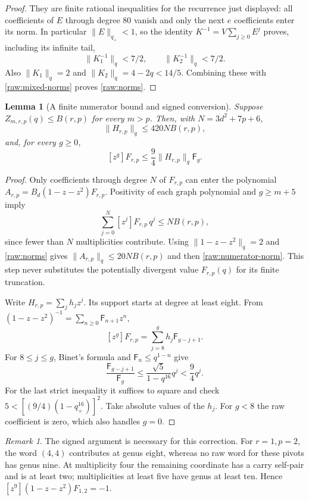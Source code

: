 \documentclass[11pt]{amsart}
\newtheorem{lemma}[theorem]{Lemma}
\theoremstyle{definition}
\theoremstyle{remark}
\newtheorem{remark}[theorem]{Remark}
\newcommand{\Fib}{\mathsf F}
\numberwithin{equation}{section}
\begin{document}
\begin{proof}
They are finite rational inequalities for the recurrence just displayed:
all coefficients of $E$ through degree $80$ vanish and only the next
$e$ coefficients enter its norm.  In particular $\|E\|_{q_+}<1$,
so the identity $K^{-1}=V\sum_{j\ge0}E^j$ proves, including its
infinite tail,
\[
 \|K_1^{-1}\|_q<7/2,\qquad \|K_2^{-1}\|_q<7/2.
\]
Also $\|K_1\|_q=2$ and $\|K_2\|_q=4-2q<14/5$.
Combining these with \eqref{raw:mixed-norms} proves \eqref{raw:norms}.
\end{proof}

\begin{lemma}[A finite numerator bound and signed conversion]\label{raw:signed}
Suppose $Z_{m,r,p}(q)\le B(r,p)$ for every $m>p$.  Then, with
$N=3d^2+7p+6$,
\begin{equation}\label{raw:numerator-norm}
 \|H_{r,p}\|_q\le420N B(r,p),
\end{equation}
and, for every $g\ge0$,
\begin{equation}\label{raw:fib-conversion}
 [z^g]F_{r,p}\le\frac94\|H_{r,p}\|_q\Fib_g.
\end{equation}
\end{lemma}
\begin{proof}
Only coefficients through degree $N$ of $F_{r,p}$ can enter the polynomial
$A_{r,p}=B_d(1-z-z^2)F_{r,p}$.  Positivity of each graph polynomial
and $g\ge m+5$ imply
\[
 \sum_{j=0}^N[z^j]F_{r,p}\,q^j\le N B(r,p),
\]
since fewer than $N$ multiplicities contribute.  Using
$\|1-z-z^2\|_q=2$ and \eqref{raw:norms} gives
$\|A_{r,p}\|_q\le20NB(r,p)$ and then
\eqref{raw:numerator-norm}.  This step never substitutes the potentially
divergent value $F_{r,p}(q)$ for its finite truncation.

Write $H_{r,p}=\sum_jh_jz^j$.  Its support starts at degree at least
eight.  From $(1-z-z^2)^{-1}=\sum_{n\ge0}\Fib_{n+1}z^n$,
\[
 [z^g]F_{r,p}=\sum_{j=8}^g h_j\Fib_{g-j+1}.
\]
For $8\le j\le g$, Binet's formula and
$\Fib_n\le q^{1-n}$ give
\[
 \frac{\Fib_{g-j+1}}{\Fib_g}
 \le \frac{\sqrt5}{1-q^{16}}q^j<\frac94q^j.
\]
For the last strict inequality it suffices to square and check
$5<[(9/4)(1-q_+^{16})]^2$.  Take absolute values of the $h_j$.
For $g<8$ the raw coefficient is zero, which also handles $g=0$.
\end{proof}

\begin{remark}\label{raw:not-positive}
The signed argument is necessary for this correction.  For $r=1,p=2$,
the word $(4,4)$ contributes at genus eight, whereas no raw word for
these pivots has genus nine.  At multiplicity four the remaining
coordinate has a carry self-pair and is at least two; multiplicities
at least five have genus at least ten.  Hence
$[z^9](1-z-z^2)F_{1,2}=-1$.
\end{remark}
\end{document}
